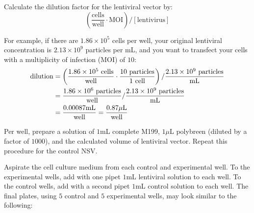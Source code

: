 Calculate the dilution factor for the lentiviral vector by:
\begin{equation*}
\left(\frac{\text{cells}}{\text{well}}\cdot \text{MOI}\right)/\left[\text{lentivirus}\right]
\end{equation*}

For example, if there are $1.86\times 10^5$ cells per well, your original lentiviral concentration is $2.13\times 10^9$ particles per mL, and you want to transfect your cells with a multiplicity of infection (MOI) of $10$:
\begin{align*}
\text{dilution} &= \left(\frac{1.86\times 10^{5}\text{ cells}}{\text{well}}\cdot \frac{10\text{ particles}}{1\text{ cell}}\right)/\frac{2.13\times 10^{9}\text{ particles}}{\text{mL}} \\
&= \frac{1.86\times 10^{6}\text{ particles}}{\text{well}}/\frac{2.13\times 10^{9}\text{ particles}}{\text{mL}} \\
&= \frac{0.00087\text{mL}}{\text{well}} = \frac{0.87\mu\text{L}}{\text{well}}
\end{align*}

Per well, prepare a solution of $1$mL complete M199, $1\mu$L polybreen (diluted by a factor of $1000$), and the calculated volume of lentiviral vector. Repeat this procedure for the control NSV.

Aspirate the cell culture medium from each control and experimental well. To the experimental wells, add with one pipet $1$mL lentiviral solution to each well. To the control wells, add with a second pipet $1$mL control solution to each well. The final plates, using $5$ control and $5$ experimental wells, may look similar to the following:

